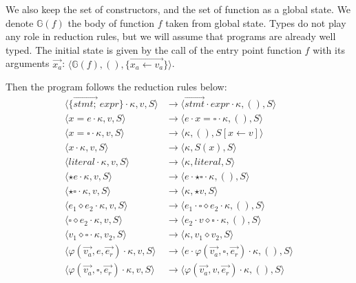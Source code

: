 \documentclass[a4paper,11pt]{article}
\begin{document}
We also keep the set of constructors, and the set of function as a global state. We denote $\mathbb{G}(f)$ the body of function $f$ taken from global state. Types do not play any role in reduction rules, but we will assume that programs are already well typed. The initial state is given by the call of the entry point function $f$ with its arguments $\overrightarrow{x_a}$: $\langle\mathbb{G}(f), (), \{\overrightarrow{x_a \leftarrow v_a}\}\rangle$.

Then the program follows the reduction rules below:
\begin{align*}
\langle\{\overrightarrow{stmt;}\ expr\} \cdot \kappa, v, S\rangle &\rightarrow \langle \overrightarrow{stmt}\cdot expr \cdot \kappa, (), S\rangle\\
\langle x = e \cdot \kappa, v, S\rangle &\rightarrow \langle e \cdot x = \square \cdot \kappa, (), S\rangle\\
\langle x = \square \cdot \kappa, v, S\rangle &\rightarrow \langle \kappa, (), S[x \leftarrow v]\rangle\\
\langle x \cdot \kappa, v, S\rangle &\rightarrow \langle \kappa, S(x), S\rangle\\
\langle literal \cdot \kappa, v, S\rangle &\rightarrow \langle \kappa, literal, S\rangle\\
\langle \star e \cdot \kappa, v, S\rangle &\rightarrow \langle e \cdot \star \square \cdot \kappa, (), S\rangle\\
\langle \star \square \cdot \kappa, v, S\rangle &\rightarrow \langle \kappa, \star v, S\rangle\\
\langle e_1 \diamond e_2 \cdot \kappa, v, S\rangle &\rightarrow \langle e_1 \cdot \square \diamond e_2 \cdot \kappa, (), S\rangle\\
\langle \square \diamond e_2 \cdot \kappa, v, S\rangle &\rightarrow \langle e_2 \cdot v \diamond \square \cdot \kappa, (), S\rangle\\
\langle v_1 \diamond \square \cdot \kappa, v_2, S\rangle &\rightarrow \langle \kappa, v_1 \diamond v_2, S\rangle\\
\langle \varphi(\overrightarrow{v_a}, e, \overrightarrow{e_r}) \cdot \kappa, v, S\rangle &\rightarrow \langle e \cdot \varphi(\overrightarrow{v_a}, \square, \overrightarrow{e_r}) \cdot \kappa, (), S\rangle\\
\langle \varphi(\overrightarrow{v_a}, \square, \overrightarrow{e_r}) \cdot \kappa, v, S\rangle &\rightarrow \langle \varphi(\overrightarrow{v_a}, v, \overrightarrow{e_r}) \cdot \kappa, (), S\rangle\\

\end{align*}
\end{document}
